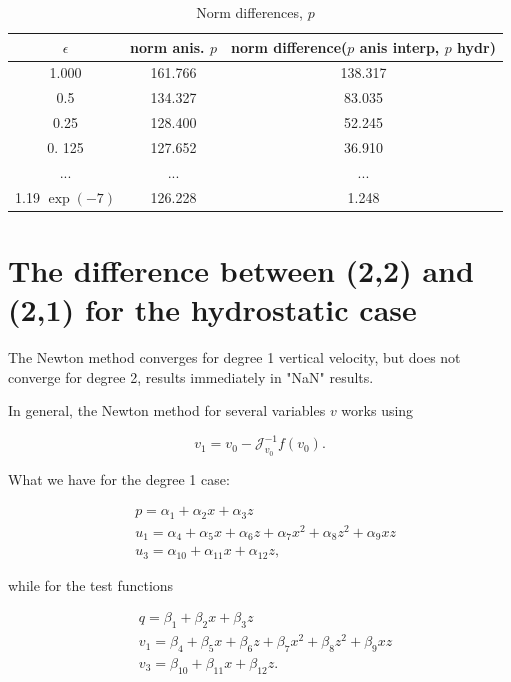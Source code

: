 \documentclass[11pt]{article}
\begin{document}
\begin{table}[H]
\caption{Norm differences, $p$}
\begin{center}
\begin{tabular}{ccc}
    \hline
    $\epsilon$ & norm anis. $p$ &  norm difference($p$ anis interp, $p$ hydr)\\
    \hline
    1.000 & 161.766 & 138.317 \\
    0.5 & 134.327 & 83.035 \\
    0.25 &128.400 & 52.245 \\   
    0. 125 & 127.652 & 36.910 \\
    ... & ... & ...  \\       
    1.19 $\exp(-7)$ & 126.228 & 1.248 \\       
    \hline
\end{tabular}
\end{center}
\end{table}

\section{The difference between (2,2) and (2,1) for the hydrostatic case}

The Newton method converges for degree 1 vertical velocity, but does not converge for degree 2, results immediately in "NaN" results.

In general, the Newton method for several variables $v$ works using

$$ v_1 = v_0 - \mathcal{J}^{-1}_{v_0} f(v_0).$$

What we have for the degree 1 case:

\begin{equation}
  \begin{split}
    &p = \alpha_1 + \alpha_2 x + \alpha_3 z \\
    &u_1 = \alpha_4 + \alpha_5 x + \alpha_6 z + \alpha_7 x^2 + \alpha_8 z^2 + \alpha_9 xz \\
    &u_3 = \alpha_{10} + \alpha_{11} x + \alpha_{12} z,
  \end{split}
\end{equation}

while for the test functions

\begin{equation}
  \begin{split}
    &q = \beta_1 + \beta_2 x + \beta_3 z \\
    &v_1 = \beta_4 + \beta_5 x + \beta_6 z + \beta_7 x^2 + \beta_8 z^2 + \beta_9 xz \\
    &v_3 = \beta_{10} + \beta_{11} x + \beta_{12} z.
  \end{split}
\end{equation}
\end{document}
